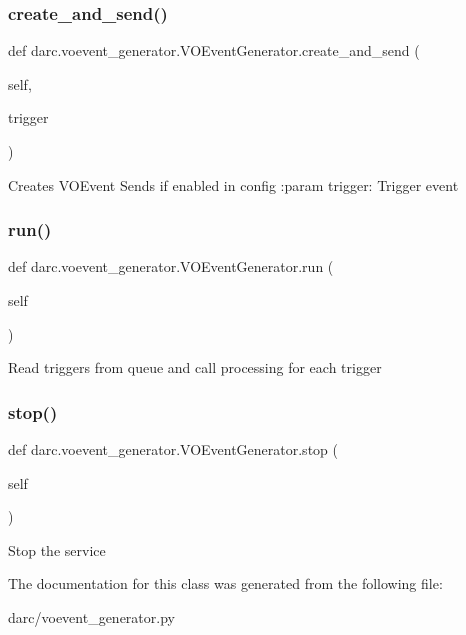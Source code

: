 \subsubsection{\texorpdfstring{create\_and\_send()}{create\_and\_send()}}
{\footnotesize\ttfamily def darc.\+voevent\+\_\+generator.\+V\+O\+Event\+Generator.\+create\+\_\+and\+\_\+send (\begin{DoxyParamCaption}\item[{}]{self,  }\item[{}]{trigger }\end{DoxyParamCaption})}

\begin{DoxyVerb}Creates VOEvent
Sends if enabled in config
:param trigger: Trigger event
\end{DoxyVerb}
 \mbox{\label{classdarc_1_1voevent__generator_1_1_v_o_event_generator_af3b4cb052fcca1453a8bc2878d0cf04d}} 
\subsubsection{\texorpdfstring{run()}{run()}}
{\footnotesize\ttfamily def darc.\+voevent\+\_\+generator.\+V\+O\+Event\+Generator.\+run (\begin{DoxyParamCaption}\item[{}]{self }\end{DoxyParamCaption})}

\begin{DoxyVerb}Read triggers from queue and call processing for each trigger
\end{DoxyVerb}
 \mbox{\label{classdarc_1_1voevent__generator_1_1_v_o_event_generator_a192b76db66e43572e91d020462afe6ed}} 
\subsubsection{\texorpdfstring{stop()}{stop()}}
{\footnotesize\ttfamily def darc.\+voevent\+\_\+generator.\+V\+O\+Event\+Generator.\+stop (\begin{DoxyParamCaption}\item[{}]{self }\end{DoxyParamCaption})}

\begin{DoxyVerb}Stop the service
\end{DoxyVerb}
 

The documentation for this class was generated from the following file\+:\begin{DoxyCompactItemize}
\item 
darc/voevent\+\_\+generator.\+py\end{DoxyCompactItemize}
